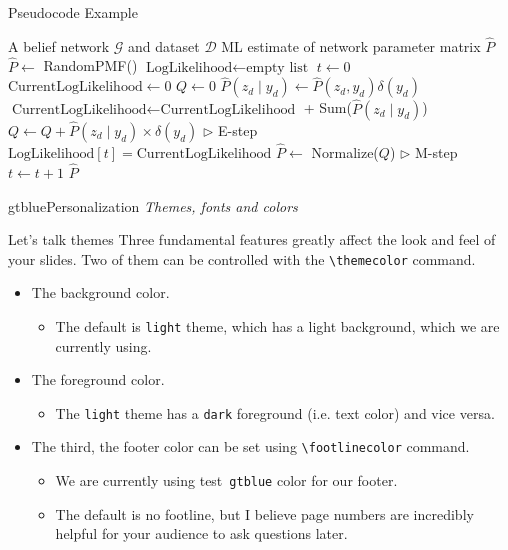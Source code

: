 \documentclass{beamer}
\newcommand{\testcolor}[1]{\colorbox{#1}{\textcolor{#1}{test}}~\texttt{#1}}
\newcommand*\CALL[2]{\textsf{#1}(#2)}
\newcommand*\ANNOTATE[1]{\hfill\(\triangleright\) #1}
\begin{document}
\footlinecolor{}

\begin{frame}[fragile]{Pseudocode Example}
\begin{algorithm}[H]
\fontsize{8}{1}\selectfont
\caption{Running EM using the joint PMFs, $P$, $Q$, $\hat P$}
\begin{algorithmic}
\REQUIRE A belief network $\mathcal{G}$ and dataset $ \mathcal{D}$
\ENSURE ML estimate of network parameter matrix $\hat P$
\STATE $\hat P \gets$ \CALL{RandomPMF}{}
\STATE $\text{LogLikelihood} \gets \text{empty list}$
\STATE $t \gets 0$
\REPEAT
    \STATE $\text{CurrentLogLikelihood} \gets 0$
    \STATE $Q \gets 0$
        \STATE $\hat P(z_d \mid y_d) \gets \hat P(z_d, y_d) \delta(y_d)$
        \STATE $\text{CurrentLogLikelihood} \gets \text{CurrentLogLikelihood}$ + \CALL{Sum}{$\hat P(z_d \mid y_d)$}
        \STATE $Q \gets Q + \hat P(z_d \mid y_d) \times \delta(y_d)$ \ANNOTATE{E-step}
    \ENDFOR
    \STATE $\text{LogLikelihood}[t] = \text{CurrentLogLikelihood}$
    \STATE $\hat P \gets$ \CALL{Normalize}{$Q$} \ANNOTATE{M-step}
    \STATE $t \gets t + 1$
\RETURN $\hat P$
\end{algorithmic}
\end{algorithm}
\end{frame}



\begin{chapter}{gtblue}{Personalization}
\textit{Themes, fonts and colors}
\end{chapter}


\begin{frame}[fragile]{Let's talk themes}
Three fundamental features greatly affect the look and feel of your slides. Two of them can be controlled with the \verb|\themecolor| command.
\begin{itemize}
\item The background color.
\begin{itemize}
    \item The default is \verb|light| theme, which has a light background, which we are currently using.
\end{itemize}
\item The foreground color.
\begin{itemize}
    \item The \verb|light| theme has a \verb|dark| foreground (i.e. text color) and vice versa.
\end{itemize}
\item The third, the footer color can be set using \verb|\footlinecolor| command.
\begin{itemize}
    \item We are currently using \testcolor{gtblue} color for our footer.
    \item The default is no footline, but I believe page numbers are incredibly helpful for your audience to ask questions later.
\end{itemize}
\end{itemize}
\end{frame}
\end{document}
